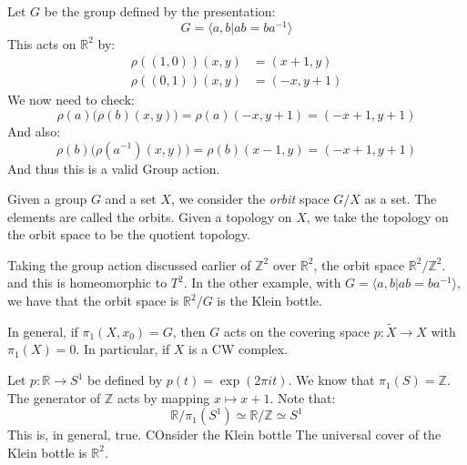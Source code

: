\documentclass[crop=false,class=book,oneside]{standalone}
\begin{document}
        \begin{lexample}
            Let $G$ be the group defined by the presentation:
            \begin{equation}
                G=\langle{a,b|ab=ba^{\minus{1}}}\rangle
            \end{equation}
            This acts on $\mathbb{R}^{2}$ by:
            \begin{subequations}
                \begin{align}
                    \rho((1,0))(x,y)&=(x+1,y)\\
                    \rho((0,1))(x,y)&=(\minus{x},y+1)
                \end{align}
            \end{subequations}
            We now need to check:
            \begin{equation}
                \rho(a)\big(\rho(b)(x,y)\big)=
                \rho(a)(\minus{x},y+1)=
                (\minus{x}+1,y+1)
            \end{equation}
            And also:
            \begin{equation}
                \rho(b)\big(\rho(a^{\minus{1}})(x,y)\big)=
                \rho(b)(x-1,y)=(\minus{x}+1,y+1)
            \end{equation}
            And thus this is a valid Group action.
        \end{lexample}
        Given a group $G$ and a set $X$, we consider the
        \textit{orbit} space $G/X$ as a set. The elements are
        called the orbits. Given a topology on $X$, we take
        the topology on the orbit space to be the quotient
        topology.
        \begin{lexample}
            Taking the group action discussed earlier of
            $\mathbb{Z}^{2}$ over $\mathbb{R}^{2}$, the orbit
            space $\mathbb{R}^{2}/\mathbb{Z}^{2}$. and this is
            homeomorphic to $T^{2}$. In the other example, with
            $G=\langle{a,b|ab=ba^{\minus{1}}}\rangle$,
            we have that the orbit space is
            $\mathbb{R}^{2}/G$ is the Klein bottle.
        \end{lexample}
        In general, if $\pi_{1}(X,x_{0})=G$, then $G$ acts on
        the covering space
        $p:\tilde{X}\rightarrow{X}$ with $\pi_{1}(X)=0$. In
        particular, if $X$ is a CW complex.
        \begin{lexample}
            Let $p:\mathbb{R}\rightarrow{S}^{1}$ be defined by
            $p(t)=\exp(2\pi{i}t)$. We know that
            $\pi_{1}(S)=\mathbb{Z}$. The generator of
            $\mathbb{Z}$ acts by mapping
            $x\mapsto{x}+1$. Note that:
            \begin{equation}
                \mathbb{R}/\pi_{1}(S^{1})\simeq
                \mathbb{R}/\mathbb{Z}\simeq
                S^{1}
            \end{equation}
            This is, in general, true. COnsider the Klein bottle
            The universal cover of the Klein bottle is
            $\mathbb{R}^{2}$. 
        \end{lexample}
\end{document}
